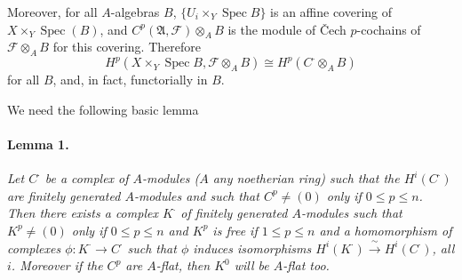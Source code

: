 
\DeclareMathOperator{\Spec}{Spec}


Moreover, for all $A$-algebras $B$, $\{U_i \times_Y \Spec B\}$ is an affine
covering of $X \times_Y \Spec(B)$, and
$C^p(\mathfrak{A}, \mathcal{F}) \otimes_A B$ is the module of \v{C}ech
$p$-cochains of $\mathcal{F} \otimes_A B$ for this covering. Therefore
\[
  H^p(X \times_Y \Spec B, \mathcal{F} \otimes_A B)
    \cong H^p(C^{\cdot} \otimes_A B)
\]
for all $B$, and, in fact, functorially in $B$.

We need the following basic lemma

\paragraph{Lemma 1.}
\textit{Let $C^{\cdot}$ be a complex of $A$-modules ($A$ any noetherian ring)
such that the $H^i(C^{\cdot})$ are finitely generated $A$-modules and such
that $C^p \neq (0)$ only if $0 \leq p \leq n$. Then there exists a complex
$K^{\cdot}$ of finitely generated $A$-modules such that $K^p \neq (0)$ only
if $0 \leq p \leq n$ and $K^p$ is free if $1 \leq p \leq n$ and a
homomorphism of complexes $\phi : K^{\cdot} \to C^{\cdot}$ such that $\phi$
induces isomorphisms
$H^i(K^{\cdot}) \xrightarrow{\ \sim\ } H^i(C^{\cdot})$, all $i$. Moreover if
the $C^p$ are $A$-flat, then $K^0$ will be $A$-flat too.}

